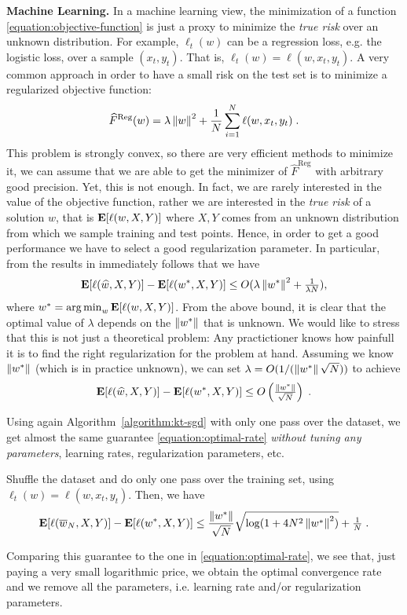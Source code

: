 \textbf{Machine Learning.} In a machine learning view, the minimization of a
function \eqref{equation:objective-function} is just a proxy to minimize the
\emph{true risk} over an unknown distribution. For example, $\ell_t(w)$ can be
a regression loss, e.g. the logistic loss, over a sample $(x_t, y_t)$. That is,
$\ell_t(w)=\ell(w,x_t,y_t)$. A very common approach in order to have a small
risk on the test set is to minimize a regularized objective function:
\begin{equation}
\label{eq:reg_logloss}
\widehat{F}^{\text{Reg}}(w) = \lambda \left\|{w}\right\|^2 + \frac{1}{N} \sum_{i=1}^N \ell(w,x_t,y_t) \; .
\end{equation}
This problem is strongly convex, so there are very efficient methods to
minimize it, we can assume that we are able to get the minimizer of
$\widehat{F}^{\text{Reg}}$ with arbitrary good precision. Yet, this is not enough. In
fact, we are rarely interested in the value of the objective function, rather
we are interested in the \emph{true risk} of a solution $w$, that is
$\operatorname*{\mathbf{E}}[\ell(w,X,Y)]$ where $X,Y$ comes from an unknown distribution from which we
sample training and test points.  Hence, in order to get a good performance we
have to select a good regularization parameter. In particular, from the results
in \cite{???} immediately follows that we have
$$
\operatorname*{\mathbf{E}}[\ell(\widehat{w},X,Y)] - \operatorname*{\mathbf{E}}[\ell(w^*,X,Y)] \le O(\lambda \left\|{w^*}\right\|^2 + \tfrac{1}{\lambda N}),
$$
where $w^*=\operatorname*{arg\,min}_w \operatorname*{\mathbf{E}}[\ell(w,X,Y)]$.  From the above bound, it is clear
that the optimal value of $\lambda$ depends on the $\left\|{w^*}\right\|$ that is
unknown. We would like to stress that this is not just a theoretical problem:
Any practictioner knows how painfull it is to find the right regularization for
the problem at hand.  Assuming we know $\left\|{w^*}\right\|$ (which is in practice
unknown), we can set $\lambda = O(1/(\left\|{w^*}\right\| \sqrt{N}))$ to achieve
\begin{equation}
\label{equation:optimal-rate}
\operatorname*{\mathbf{E}}[\ell(\widehat{w},X,Y)] - \operatorname*{\mathbf{E}}[\ell(w^*,X,Y)] \le O\left(\tfrac{\left\|{w^*}\right\|}{\sqrt{N}}\right) \; .
\end{equation}

Using again Algorithm~\ref{algorithm:kt-sgd} with only one pass
over the dataset, we get almost the same guarantee \eqref{equation:optimal-rate}
\emph{without tuning any parameters}, learning rates, regularization parameters, etc.
\begin{theorem}
Shuffle the dataset and do only one pass over the training set, using
$\ell_t(w)=\ell(w,x_t,y_t)$.  Then, we have
$$
\operatorname*{\mathbf{E}}[\ell(\overline{w}_N,X,Y)] - \operatorname*{\mathbf{E}}[\ell(w^*,X,Y)] \le \frac{\left\|{w^*}\right\|}{\sqrt{N}} \sqrt{\log(1+4 N^2 \left\|{w^*}\right\|^2)} + \tfrac{1}{N} \; .
$$
\end{theorem}
Comparing this guarantee to the one in \eqref{equation:optimal-rate}, we see
that, just paying a very small logarithmic price, we obtain the optimal
convergence rate and we remove all the parameters, i.e. learning rate and/or
regularization parameters.

